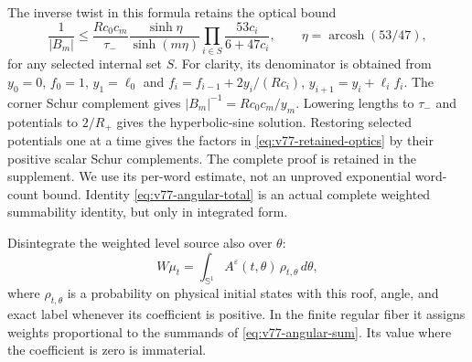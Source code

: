 The inverse twist in this formula retains the optical bound
\begin{equation}\label{eq:v77-retained-optics}
 \frac1{|B_m|}\le\frac{R c_0c_m}{\tau_-}
       \frac{\sinh\eta}{\sinh(m\eta)}
       \prod_{i\in S}\frac{53c_i}{6+47c_i},\qquad
 \eta=\operatorname{arcosh}(53/47),
\end{equation}
for any selected internal set $S$. For clarity, its denominator is
obtained from $y_0=0$, $f_0=1$, $y_1=\ell_0$ and
$f_i=f_{i-1}+2y_i/(Rc_i)$, $y_{i+1}=y_i+\ell_i f_i$.
The corner Schur complement gives $|B_m|^{-1}=Rc_0c_m/y_m$.
Lowering lengths to $\tau_-$ and potentials to $2/R_+$ gives the
hyperbolic-sine solution. Restoring selected potentials one at a time
gives the factors in \eqref{eq:v77-retained-optics} by their positive
scalar Schur complements. The complete proof is retained in the
supplement. We use its per-word estimate, not an unproved exponential
word-count bound. Identity \eqref{eq:v77-angular-total} is an actual
complete weighted summability identity, but only in integrated form.

Disintegrate the weighted level source also over $\theta$:
\begin{equation}\label{eq:v77-angular-conditionals}
              W\mu_t=\int_{\mathbb S^1}
               A^\varepsilon(t,\theta)\,\rho_{t,\theta}\,d\theta,
\end{equation}
where $\rho_{t,\theta}$ is a probability on physical initial states
with this roof, angle, and exact label whenever its coefficient is
positive. In the finite regular fiber it assigns weights proportional
to the summands of \eqref{eq:v77-angular-sum}. Its value where the
coefficient is zero is immaterial.

